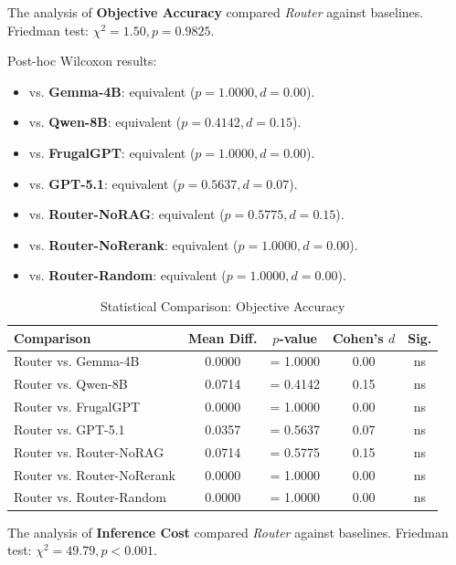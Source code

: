 
The analysis of \textbf{Objective Accuracy} compared \textit{Router} against baselines. 
Friedman test: $\chi^2 = 1.50, p = 0.9825$.

Post-hoc Wilcoxon results:
\begin{itemize}
    \item vs. \textbf{Gemma-4B}: equivalent ($p = 1.0000, d=0.00$).
    \item vs. \textbf{Qwen-8B}: equivalent ($p = 0.4142, d=0.15$).
    \item vs. \textbf{FrugalGPT}: equivalent ($p = 1.0000, d=0.00$).
    \item vs. \textbf{GPT-5.1}: equivalent ($p = 0.5637, d=0.07$).
    \item vs. \textbf{Router-NoRAG}: equivalent ($p = 0.5775, d=0.15$).
    \item vs. \textbf{Router-NoRerank}: equivalent ($p = 1.0000, d=0.00$).
    \item vs. \textbf{Router-Random}: equivalent ($p = 1.0000, d=0.00$).
\end{itemize}

\begin{table}[H]
\centering
\caption{Statistical Comparison: Objective Accuracy}
\label{tab:stats_objective}
\begin{tabular}{lcccc}
\toprule
\textbf{Comparison} & \textbf{Mean Diff.} & \textbf{$p$-value} & \textbf{Cohen's $d$} & \textbf{Sig.} \\ \midrule
Router vs. Gemma-4B & 0.0000 & = 1.0000 & 0.00 & ns \\ 
Router vs. Qwen-8B & 0.0714 & = 0.4142 & 0.15 & ns \\ 
Router vs. FrugalGPT & 0.0000 & = 1.0000 & 0.00 & ns \\ 
Router vs. GPT-5.1 & 0.0357 & = 0.5637 & 0.07 & ns \\ 
Router vs. Router-NoRAG & 0.0714 & = 0.5775 & 0.15 & ns \\ 
Router vs. Router-NoRerank & 0.0000 & = 1.0000 & 0.00 & ns \\ 
Router vs. Router-Random & 0.0000 & = 1.0000 & 0.00 & ns \\ 
\bottomrule
\end{tabular}
\end{table}


The analysis of \textbf{Inference Cost} compared \textit{Router} against baselines. 
Friedman test: $\chi^2 = 49.79, p < 0.001$.

